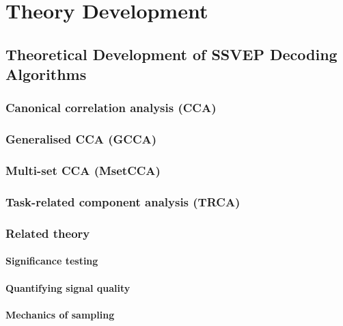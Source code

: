 \chapter{Theory Development}
\label{chapter:theory-development}

\graphicspath{ {report/Chapter3/assets/} } 

\section{Theoretical Development of SSVEP Decoding Algorithms}

\subsection{Canonical correlation analysis (CCA)}

\subsection{Generalised CCA (GCCA)}

\subsection{Multi-set CCA (MsetCCA)}

\subsection{Task-related component analysis (TRCA)}

\subsection{Related theory}
\subsubsection{Significance testing}
\subsubsection{Quantifying signal quality}
\subsubsection{Mechanics of sampling}